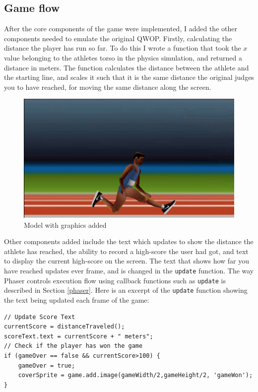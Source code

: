 \documentclass[12pt,a4paper,twoside,openright]{report}
\begin{document}
\subsection{Game flow}
\label{sec:gameFlow}
After the core components of the game were implemented, I added the other components needed to emulate the original QWOP.
Firstly, calculating the distance the player has run so far. To do this I wrote a function that took the $x$ value belonging to the athletes torso in the physics simulation, and returned a distance in meters. The function calculates the distance between the athlete and the starting line, and scales it such that 
it is the same distance the original judges you to have reached, for moving the same distance along the screen.

\begin{figure}[tbh]
\centerline{\includegraphics[scale=0.4]{Images/modelWithGraphics.PNG}}
\caption{Model with graphics added}
\label{modelWithGraphics}
\end{figure}

Other components added include the text which updates to show the distance the athlete has reached, the ability to record a high-score the user had got, and text to display the current high-score on the screen.
The text that shows how far you have reached updates ever frame, and is changed in the 
\texttt{update} function.
The way Phaser controls execution flow using callback functions such as \texttt{update} is described in Section \ref{phaser}.
Here is an excerpt of the \texttt{update} function showing the text being updated each frame of the game:

\begin{displayquote}
	\begin{verbatim}// Update Score Text
currentScore = distanceTraveled();
scoreText.text = currentScore + " meters";
// Check if the player has won the game
if (gameOver == false && currentScore>100) {
    gameOver = true;
    coverSprite = game.add.image(gameWidth/2,gameHeight/2, 'gameWon');
}\end{verbatim}
\end{displayquote}
\end{document}
